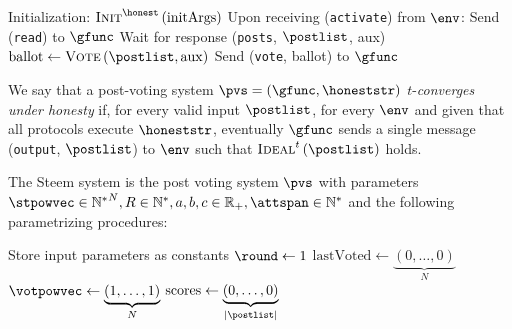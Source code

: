     \begin{algorithm}[H]
      \caption{$\honeststr\left(\textsc{Init}^{\honest},
      \textsc{Vote}\right)\left(\mathrm{initArgs}\right)$}
      \label{alg:honest}
      \begin{algorithmic}[1]
        \State Initialization:
        \Indent
          \State $\textsc{Init}^{\honest}\left(\mathrm{initArgs}\right)$
        \EndIndent
        \State
        \State Upon receiving (\texttt{activate}) from $\env$:
        \Indent
          \State Send (\texttt{read}) to $\gfunc$
          \State Wait for response (\texttt{posts}, $\postlist$, aux)
          \State $\mathrm{ballot} \gets \textsc{Vote}\left(\postlist,
          \mathrm{aux}\right)$
          \State Send (\texttt{vote}, ballot) to $\gfunc$
        \EndIndent
      \end{algorithmic}
    \end{algorithm}

    \begin{definition}
      We say that a post-voting system $\pvs = \left(\gfunc, \honeststr\right)$
      $t$-\emph{converges under honesty} if, for every valid input
      $\postlist$, for every $\env$ and given that all protocols execute
      $\honeststr$, eventually $\gfunc$ sends a single message (\texttt{output},
      $\postlist$) to $\env$ such that $\textsc{Ideal}^t\left(\postlist\right)$
      holds.
    \end{definition}

    \begin{definition}
      The Steem system is the post voting system $\pvs$ with parameters
      $\stpowvec \in {\mathbb{N}^*}^N, R \in \mathbb{N}^*, a, b, c \in
      \mathbb{R}_{+}, \attspan \in \mathbb{N}^*$ and the following parametrizing
      procedures:
    \end{definition}

    \begin{algorithm}[H]
      \caption{$\textsc{Init}^{\gfunc}\left(\stpowvec, \rounds,
      a, b, c\right)$}
      \label{alg:steem:init:gfunc}
      \begin{algorithmic}[1]
        \State Store input parameters as constants
        \State $\round \gets 1$
        \State $\mathrm{lastVoted} \gets \underbrace{\left(0, \dots, 0\right)}_{N}$
        \State $\votpowvec \gets \underbrace{\left(1, \dots, 1\right)}_{N}$
        \State $\mathrm{scores} \gets \underbrace{\left(0, \dots,
        0\right)}_{|\postlist|}$
      \end{algorithmic}
    \end{algorithm}

